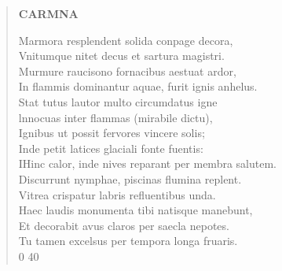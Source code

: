 \documentclass[11pt, a4paper]{report}
\begin{document}
\begin{verse}
    \begin{center} \textbf{CARMNA} \end{center} \marginpar{[290]} Marmora resplendent solida conpage decora, \\ Vnitumque nitet decus  \lbrack et \rbrack  sartura magistri. \\ Murmure raucisono fornacibus aestuat ardor, \\ In flammis dominantur aquae, furit ignis anhelus. \\ Stat tutus lautor multo circumdatus igne \\ lnnocuas inter flammas (mirabile dictu), \\ Ignibus ut possit fervores vincere solis; \\ Inde petit latices glaciali fonte fuentis: \\ IHinc calor, inde nives reparant per membra salutem. \\ Discurrunt nymphae, piscinas flumina replent. \\ Vitrea crispatur labris refluentibus unda. \\ Haec laudis monumenta tibi natisque manebunt, \\ Et decorabit avus claros per saecla nepotes. \\ Tu tamen excelsus per tempora longa fruaris. \\ 0 40 \\ 
      \end{verse}
  
\end{document}
